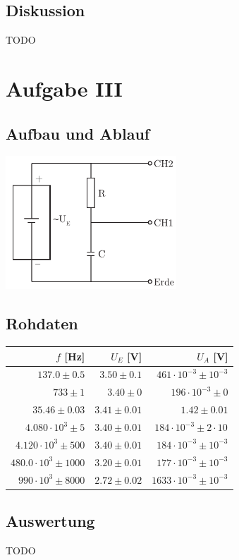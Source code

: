 \documentclass[12pt,a4paper]{article}
\begin{document}
\subsection*{Diskussion}
TODO


\section*{Aufgabe III}
\subsection*{Aufbau und Ablauf}
\includegraphics[height=5cm]{illustration3.pdf}

\subsection*{Rohdaten} 
\begin{tabular}{|r|r|r|}
\hline
$f$ [Hz]&$U_E$ [V]&$U_A$ [V]\\
\hline
$137.0 \pm 0.5$&$3.50 \pm 0.1$&$461\cdot 10^{-3} \pm 10^{-3}$\\
$733 \pm 1$&$3.40 \pm 0$&$196\cdot 10^{-3} \pm 0$\\
$35.46 \pm 0.03$&$3.41 \pm 0.01$&$1.42 \pm 0.01$\\
$4.080\cdot 10^{3} \pm 5$&$3.40 \pm 0.01$&$184\cdot 10^{-3} \pm 2\cdot 10^{}$\\
$4.120\cdot 10^{3} \pm 500$&$3.40 \pm 0.01$&$184\cdot 10^{-3} \pm 10^{-3}$\\
$480.0\cdot 10^{3} \pm 1000$&$3.20 \pm 0.01$&$177\cdot 10^{-3} \pm 10^{-3}$\\
$990\cdot 10^{3} \pm 8000$&$2.72 \pm 0.02$&$1633\cdot 10^{-3} \pm 10^{-3}$\\
\hline
\end{tabular}

\subsection*{Auswertung}
TODO
\end{document}
